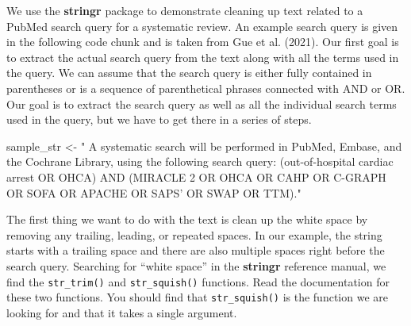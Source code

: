 \documentclass[
  letterpaper,
]{latex/krantz}
\makeatletter
\newenvironment{Shaded}{\begin{snugshade}}{\end{snugshade}}
\newcommand{\NormalTok}[1]{\textcolor[rgb]{0.00,0.23,0.31}{#1}}
\newcommand{\OtherTok}[1]{\textcolor[rgb]{0.00,0.23,0.31}{#1}}
\newcommand{\StringTok}[1]{\textcolor[rgb]{0.13,0.47,0.30}{#1}}
\newenvironment{kframe}{%
\medskip{}
\setlength{\fboxsep}{.8em}
 \def\at@end@of@kframe{}%
 \ifinner\ifhmode%
  \def\at@end@of@kframe{\end{minipage}}%
  \begin{minipage}{\columnwidth}%
 \fi\fi%
 \def\FrameCommand##1{\hskip\@totalleftmargin \hskip-\fboxsep
 \colorbox{shadecolor}{##1}\hskip-\fboxsep
     \hskip-\linewidth \hskip-\@totalleftmargin \hskip\columnwidth}%
 \MakeFramed {\advance\hsize-\width
   \@totalleftmargin\z@ \linewidth\hsize
   \@setminipage}}%
 {\par\unskip\endMakeFramed%
 \at@end@of@kframe}
\renewenvironment{Shaded}{\begin{kframe}}{\end{kframe}}
\makeatother
\begin{document}
We use the \textbf{stringr} package to demonstrate cleaning up text
related to a PubMed search query for a systematic review. An example
search query is given in the following code chunk and is taken from Gue
et al. (2021). Our first goal is to extract the actual search query from
the text along with all the terms used in the query. We can assume that
the search query is either fully contained in parentheses or is a
sequence of parenthetical phrases connected with AND or OR. Our goal is
to extract the search query as well as all the individual search terms
used in the query, but we have to get there in a series of steps.

\begin{Shaded}
\begin{Highlighting}[]
\NormalTok{sample\_str }\OtherTok{\textless{}{-}} \StringTok{" A systematic search will be performed in PubMed, }
\StringTok{Embase, and the Cochrane Library, using the following search query:   }
\StringTok{(\textquotesingle{}out{-}of{-}hospital cardiac arrest\textquotesingle{} OR \textquotesingle{}OHCA\textquotesingle{}) AND (\textquotesingle{}MIRACLE 2\textquotesingle{} OR }
\StringTok{\textquotesingle{}OHCA\textquotesingle{} OR \textquotesingle{}CAHP\textquotesingle{} OR \textquotesingle{}C{-}GRAPH\textquotesingle{} OR \textquotesingle{}SOFA\textquotesingle{} OR \textquotesingle{}APACHE\textquotesingle{} OR \textquotesingle{}SAPS’ OR }
\StringTok{\textquotesingle{}SWAP\textquotesingle{} OR \textquotesingle{}TTM\textquotesingle{})."}
\end{Highlighting}
\end{Shaded}

The first thing we want to do with the text is clean up the white space
by removing any trailing, leading, or repeated spaces. In our example,
the string starts with a trailing space and there are also multiple
spaces right before the search query. Searching for ``white space'' in
the \textbf{stringr} reference manual, we find the \texttt{str\_trim()}
and \texttt{str\_squish()} functions. Read the documentation for these
two functions. You should find that
\texttt{str\_squish()}
is the function we are looking for and that it takes a single argument.
\end{document}
